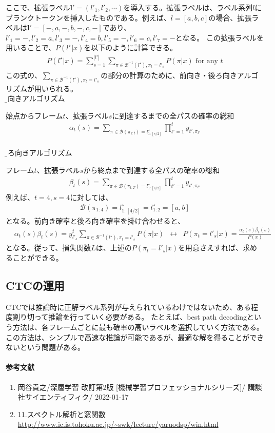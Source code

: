 \documentclass{ltjsarticle}
\begin{document}
\par
ここで、拡張ラベル$\mathbf{l}'=(l'_1, l'_2, \cdots)$を導入する。拡張ラベルは、ラベル系列$l$にブランクトークンを挿入したものである。例えば、$l=[a, b, c]$の場合、拡張ラベルは$\mathbf{l}'=[-, a, -, b, -, c, -]$であり、$l'_1=-, l'_2=a, l'_3=-, l'_4=b, l'_5=-, l'_6=c, l'_7=-$となる。
この拡張ラベルを用いることで、$P(l^{\star}|x)$を以下のように計算できる。
\begin{align}
  P(l^{\star}|x) = \sum_{s=1}^{|l'|} \sum_{\pi \in \mathcal{B}^{-1}(l^{\star}), \pi_t=l'_s} P(\pi|x) \text{ for any }t
\end{align}
この式の、$\sum_{\pi \in \mathcal{B}^{-1}(l^{\star}), \pi_t=l'_s}$の部分の計算のために、前向き・後ろ向きアルゴリズムが用いられる。
\\
\b{前向きアルゴリズム}
\par
始点からフレーム$t$、拡張ラベル$s$に到達するまでの全パスの確率の総和
\begin{align}
  \alpha_t(s) = \sum_{\pi \in \mathcal{B}(\pi_{1:t}) = l_{1:[s/2]}^{\star} } \prod_{t'=1}^{t}y_{t',\pi_{t'}}
\end{align}
\\
\b{後ろ向きアルゴリズム}
\par
フレーム$t$、拡張ラベル$s$から終点まで到達する全パスの確率の総和
\begin{align}
  \beta_t(s) = \sum_{\pi \in \mathcal{B}(\pi_{t:T}) = l_{1:[s/2]}^{\star} } \prod_{t'=1}^{t}y_{t',\pi_{t'}}
\end{align}
例えば、$t=4, s=4$に対しては、
\begin{align}
  \mathcal{B}(\pi_{1:4}) = l_{1:[4/2]}^{\star} = l_{1:2}^{\star} = [a, b]
\end{align}
となる。前向き確率と後ろ向き確率を掛け合わせると、
\begin{align}
  &\alpha_t(s)\beta_t(s) = y_{l'_s}^{t} \sum_{\pi \in \mathcal{B}^{-1}(l^{\star}), \pi_t=l'_s} P(\pi|x)
  &\leftrightarrow
  &P(\pi_t=l'_s|x) = \frac{\alpha_t(s)\beta_t(s)}{P(x)}
\end{align}
となる。従って、損失関数$L$は、上述の$P(\pi_t=l'_s|x)$を用意さえすれば、求めることができる。

\subsection{CTCの運用}
CTCでは推論時に正解ラベル系列が与えられているわけではないため、ある程度割り切って推論を行っていく必要がある。
たとえば、best path decodingという方法は、各フレームごとに最も確率の高いラベルを選択していく方法である。この方法は、シンプルで高速な推論が可能であるが、最適な解を得ることができないという問題がある。


\clearpage
\paragraph{参考文献}
\begin{enumerate}
  \item 岡谷貴之/深層学習 改訂第2版 [機械学習プロフェッショナルシリーズ]/ 講談社サイエンティフィク/ 2022-01-17
  \item 11.スペクトル解析と窓関数 \url{http://www.ic.is.tohoku.ac.jp/~swk/lecture/yaruodsp/win.html}
\end{enumerate}

\newpage
\end{document}
